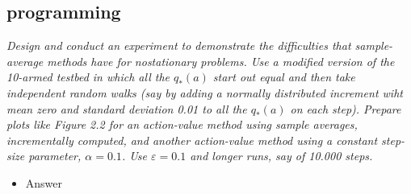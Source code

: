 \documentclass{article}
\begin{document}
\subsection{programming}
\textit{Design and conduct an experiment to demonstrate the difficulties that sample-average methods have for nostationary problems. Use a modified version of the 10-armed testbed in which all the $q_* (a)$ start out equal and then take independent random walks (say by adding a normally distributed increment wiht mean zero and standard deviation 0.01 to all the $q_* (a)$ on each step). Prepare plots like Figure 2.2 for an action-value method using sample averages, incrementally computed, and another action-value method using a constant step-size parameter, $\alpha = 0.1$. Use $\varepsilon = 0.1$ and longer runs, say of 10.000 steps. }
\begin{itemize}
\item Answer
\end{itemize}
\end{document}
